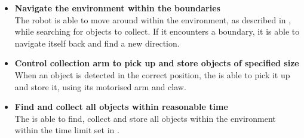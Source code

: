     \begin{itemize}
    \item \textbf{Navigate the environment within the boundaries}\\
        The robot is able to move around within the environment, as described in , while searching for objects to collect. If it encounters a boundary, it is able to navigate itself back and find a new direction.
    \item \textbf{Control collection arm to pick up and store objects of specified size}\\
        When an object is detected in the correct position, the \projname{} is able to pick it up and store it, using its motorised arm and claw.
    \item \textbf{Find and collect all objects within reasonable time}\\
        The \projname{} is able to find, collect and store all objects within the environment within the time limit set in .
\end{itemize}






